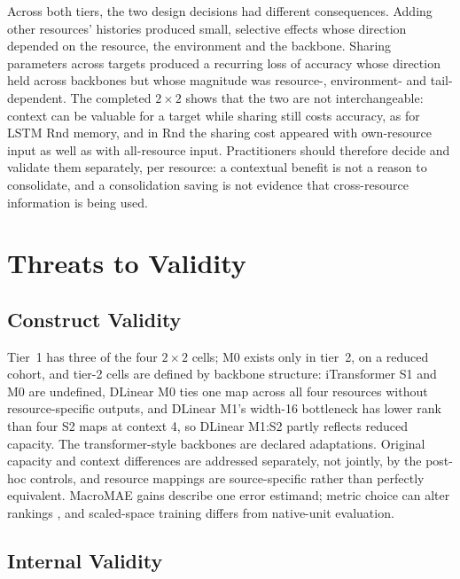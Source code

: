 \documentclass[5p,twocolumn]{elsarticle}
\begin{document}
Across both tiers, the two design decisions had different consequences.
Adding other resources' histories produced small, selective effects whose
direction depended on the resource, the environment and the backbone.
Sharing parameters across targets produced a recurring loss of accuracy
whose direction held across backbones but whose magnitude was resource-,
environment- and tail-dependent. The completed $2\times2$ shows that the two
are not interchangeable: context can be valuable for a target while sharing
still costs accuracy, as for LSTM Rnd memory, and in Rnd the sharing cost
appeared with own-resource input as well as with all-resource input. Practitioners should therefore decide
and validate them separately, per resource: a contextual benefit is not a
reason to consolidate, and a consolidation saving is not evidence that
cross-resource information is being used.

\section{Threats to Validity}
\label{sec:threats}

\subsection{Construct Validity}
\label{sec:threats-construct}

Tier~1 has three of the four $2\times2$ cells; M0 exists only in tier~2, on a
reduced cohort, and tier-2 cells are defined by backbone structure:
iTransformer S1 and M0 are undefined, DLinear M0 ties one map across all four
resources without resource-specific outputs, and DLinear M1's width-16
bottleneck has lower rank than four S2 maps at context 4, so DLinear M1:S2
partly reflects reduced capacity. The transformer-style backbones are declared
adaptations. Original capacity and context differences are addressed
separately, not jointly, by the post-hoc controls, and resource mappings are
source-specific rather than perfectly equivalent. MacroMAE gains describe one
error estimand; metric choice can alter rankings \citep{Hyndman2006Accuracy},
and scaled-space training differs from native-unit evaluation.

\subsection{Internal Validity}
\label{sec:threats-internal}
\end{document}
